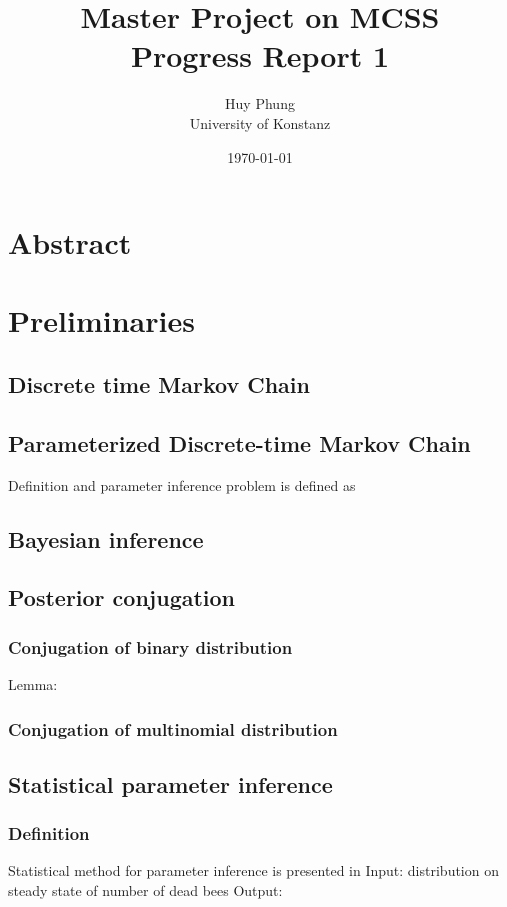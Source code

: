 \documentclass[12pt]{article}
\title{Master Project on MCSS\\ Progress Report 1}
\author{Huy Phung\\University of Konstanz}
\date{\today}
\begin{document}
\maketitle

\section{Abstract}

\section{Preliminaries}
\subsection{Discrete time Markov Chain}
\subsection{Parameterized Discrete-time Markov Chain}
Definition and parameter inference problem is defined as \cite{katoen2016probabilistic}
\subsection{Bayesian inference}
\subsection{Posterior conjugation}
\subsubsection{Conjugation of binary distribution}
Lemma:
\subsubsection{Conjugation of multinomial distribution}






\subsection{Statistical parameter inference}
\subsubsection{Definition}
Statistical method for parameter inference is presented in \cite{hajnal2019data}
Input: distribution on steady state of number of dead bees Output:
\end{document}
